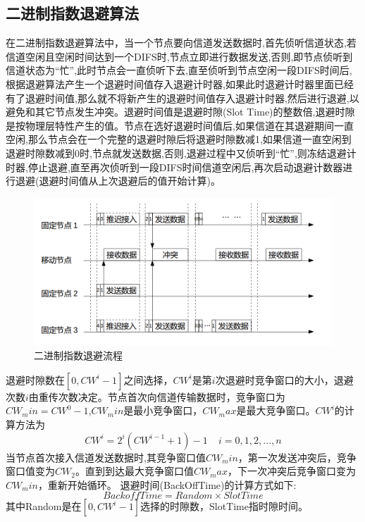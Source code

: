 \subsection{二进制指数退避算法}
在二进制指数退避算法\cite{赵占伟2011水声通信网络}中，当一个节点要向信道发送数据时,首先侦听信道状态,若信道空闲且空闲时间达到一个DIFS时,节点立即进行数据发送,否则,即节点侦听到信道状态为“忙”,此时节点会一直侦听下去,直至侦听到节点空闲一段DIFS时间后,根据退避算法产生一个退避时间值存入退避计时器,如果此时退避计时器里面已经有了退避时间值,那么就不将新产生的退避时间值存入退避计时器,然后进行退避,以避免和其它节点发生冲突。退避时间值是退避时隙(Slot Time)的整数倍,退避时隙是按物理层特性产生的值。节点在选好退避时间值后,如果信道在其退避期间一直空闲,那么节点会在一个完整的退避时隙后将退避时隙数减1,如果信道一直空闲到退避时隙数减到0时,节点就发送数据,否则,退避过程中又侦听到“忙”,则冻结退避计时器,停止退避,直至再次侦听到一段DIFS时间信道空闲后,再次启动退避计数器进行退避(退避时间值从上次退避后的值开始计算)。
\begin{figure}[ht]
	\centering
	\includegraphics[scale=0.4]{figures/backoff.png}
	\caption{
		二进制指数退避流程
	}
	\label{fig5}
\end{figure}

退避时隙数在$[0,CW^i-1]$之间选择，$CW^i$是第$i$次退避时竞争窗口的大小，退避次数$i$由重传次数决定。节点首次向信道传输数据时，竞争窗口为$CW_min=CW^0-1$,$CW_min$是最小竞争窗口，$CW_max$是最大竞争窗口。$CW^i$的计算方法为
\begin{equation}
CW^i=2^i(CW^{i-1}+1)-1\ \ \ \  \ i=0,1,2,...,n
\end{equation}
当节点首次接入信道发送数据时,其竞争窗口值$CW_min$，第一次发送冲突后，竞争窗口值变为$CW_2$。直到到达最大竞争窗口值$CW_max$，下一次冲突后竞争窗口变为$CW_min$，重新开始循环。
退避时间(BackOffTime)的计算方式如下:
\begin{equation}
BackoffTime = Random \times SlotTime
\end{equation}
其中Random是在$[0,CW^i-1]$选择的时隙数，SlotTime指时隙时间。

